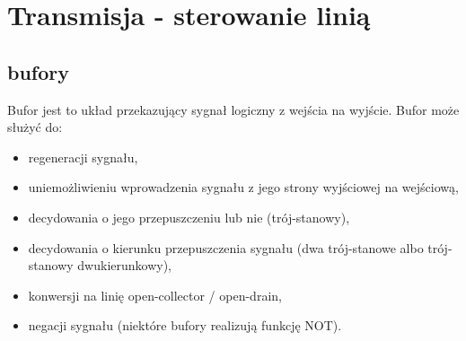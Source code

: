 % 
% 
% 
% 

\section{Transmisja - sterowanie linią}
\subsection{bufory}

Bufor jest to układ przekazujący sygnał logiczny z wejścia na wyjście. Bufor może służyć do:
\begin{itemize}
\item regeneracji sygnału,
\item uniemożliwieniu wprowadzenia sygnału z jego strony wyjściowej na wejściową,
\item decydowania o jego przepuszczeniu lub nie (trój-stanowy),
\item decydowania o kierunku przepuszczenia sygnału (dwa trój-stanowe albo trój-stanowy dwukierunkowy),
\item konwersji na linię open-collector / open-drain,
\item negacji sygnału (niektóre bufory realizują funkcję NOT).
\end{itemize}

